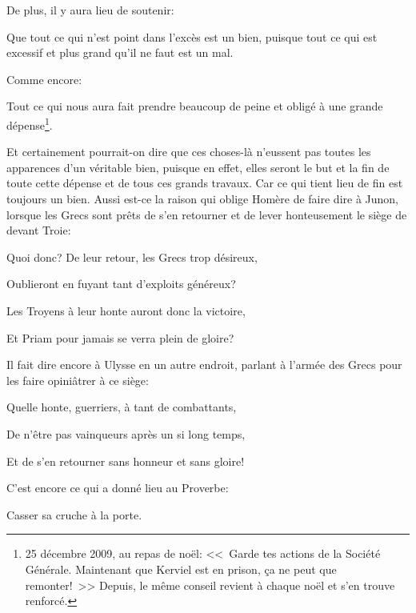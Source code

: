 \bigbreak

De plus, il y aura lieu de soutenir:

\begin{emphpar}
	Que tout ce qui n'est point dans l’excès est un bien, puisque tout ce qui est excessif et plus grand qu'il ne
	faut est un mal.
\end{emphpar}

\bigbreak

Comme encore:

\begin{emphpar}
	Tout ce qui nous aura fait prendre beaucoup de peine et obligé à une grande dépense\footnote{25 décembre 2009,
	au repas de noël: <<~Garde tes actions de la Société Générale. Maintenant que Kerviel est en prison, ça ne peut
	que remonter!~>> Depuis, le même conseil revient à chaque noël et s'en trouve renforcé.}.
\end{emphpar}

Et certainement pourrait-on dire que ces choses-là n'eussent pas toutes les apparences d'un véritable bien, puisque en
effet, elles seront le but et la fin de toute cette dépense et de tous ces grands travaux. Car ce qui tient lieu de fin
est toujours un bien. Aussi est-ce la raison qui oblige Homère de faire dire à Junon, lorsque les Grecs sont prêts de s'en
retourner et de lever honteusement le siège de devant Troie:

\begin{emphpar}
	Quoi donc? De leur retour, les Grecs trop désireux,
	
	Oublieront en fuyant tant d'exploits généreux?

	Les Troyens à leur honte auront donc la victoire,
	
	Et Priam pour jamais se verra plein de gloire?
\end{emphpar}

Il fait dire encore à Ulysse en un autre endroit, parlant à l'armée des Grecs pour les faire opiniâtrer à ce siège:

\begin{emphpar}
	Quelle honte, guerriers, à tant de combattants,

	De n'être pas vainqueurs après un si long temps,
	
	Et de s'en retourner sans honneur et sans gloire!
\end{emphpar}

C'est encore ce qui a donné lieu au Proverbe:

\begin{emphpar}
	Casser sa cruche à la porte. 
\end{emphpar}

